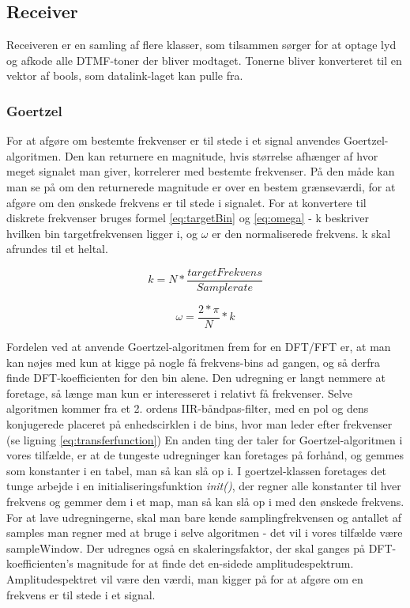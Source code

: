 \subsection{Receiver}
Receiveren er en samling af flere klasser, som tilsammen sørger for at optage lyd og afkode alle DTMF-toner der bliver modtaget. Tonerne bliver konverteret til en vektor af bools, som datalink-laget kan pulle fra.

\subsubsection{Goertzel}

For at afgøre om bestemte frekvenser er til stede i et signal anvendes Goertzel-algoritmen. Den kan returnere en magnitude, hvis størrelse afhænger af hvor meget signalet man giver, korrelerer med bestemte frekvenser. På den måde kan man se på om den returnerede magnitude er over en bestem grænseværdi, for at afgøre om den ønskede frekvens er til stede i signalet. 
For at konvertere til diskrete frekvenser bruges formel \eqref{eq:targetBin} og \eqref{eq:omega} - k beskriver hvilken bin targetfrekvensen ligger i, og $\omega$ er den normaliserede frekvens. k skal afrundes til et heltal.

\noindent\begin{minipage}{.5\linewidth}
\begin{equation} \label{eq:targetBin}
 k=N*\dfrac{targetFrekvens}{Samplerate}
\end{equation}
\end{minipage}%
\begin{minipage}{.5\linewidth}
\begin{equation}
\label{eq:omega}  
\omega = \dfrac{2*\pi}{N}*k
\end{equation}
\end{minipage}


Fordelen ved at anvende Goertzel-algoritmen frem for en DFT/FFT er, at man kan nøjes med kun at kigge på nogle få frekvens-bins ad gangen, og så derfra finde DFT-koefficienten for den bin alene. Den udregning er langt nemmere at foretage, så længe man kun er interesseret i relativt få frekvenser. Selve algoritmen kommer fra et 2. ordens IIR-båndpas-filter, med en pol og dens konjugerede placeret på enhedscirklen i de bins, hvor man leder efter frekvenser (se ligning \eqref{eq:transferfunction}) En anden ting der taler for Goertzel-algoritmen i vores tilfælde, er at de tungeste udregninger kan foretages på forhånd, og gemmes som konstanter i en tabel, man så kan slå op i. I goertzel-klassen foretages det tunge arbejde i en initialiseringsfunktion \textit{init()}, der regner alle konstanter til hver frekvens og gemmer dem i et map, man så kan slå op i med den ønskede frekvens. For at lave udregningerne, skal man bare kende samplingfrekvensen og antallet af samples man regner med at bruge i selve algoritmen - det vil i vores tilfælde være sampleWindow. Der udregnes også en skaleringsfaktor, der skal ganges på DFT-koefficienten's magnitude for at finde det en-sidede amplitudespektrum. Amplitudespektret vil være den værdi, man kigger på for at afgøre om en frekvens er til stede i et signal. 



